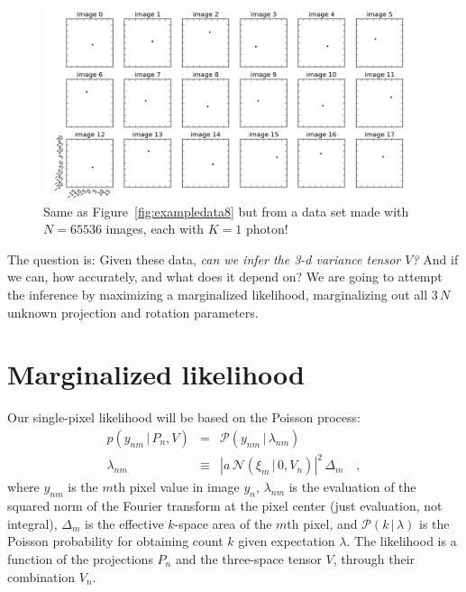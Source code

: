 \documentclass[12pt]{article}
\newcommand{\hoggcaption}[1]{\caption{\textsf{#1}}}
\renewcommand{\figurename}{\textsf{Figure}}
\newcommand{\normal}{\mathscr{N}}
\newcommand{\Poisson}{\mathscr{P}}
\newcommand{\sqnorm}[1]{|{#1}|^2}
\newcommand{\given}{\,|\,}
\begin{document}
\begin{figure}[!htp]
\includegraphics[width=\textwidth]{data_16_00.png}
\hoggcaption{Same as \figurename~\ref{fig:exampledata8} but from a data set made with
  $N=65536$ images, each with $K=1$ photon!\label{fig:exampledata0}}
\end{figure}

The question is:
Given these data, \emph{can we infer the 3-d variance tensor $V$?}
And if we can, how accurately, and what does it depend on?  We are
going to attempt the inference by maximizing a marginalized
likelihood, marginalizing out all $3\,N$ unknown projection and
rotation parameters.

\section{Marginalized likelihood}

Our single-pixel likelihood will be based on the Poisson process:
\begin{eqnarray}
  p(y_{nm}\given P_n,V) &=& \Poisson(y_{nm}\given\lambda_{nm})
  \\
  \lambda_{nm} &\equiv& \sqnorm{a\,\normal(\xi_m\given 0,V_n)}\,\Delta_m
  \quad,
\end{eqnarray}
where $y_{nm}$ is the $m$th pixel value in image $y_n$,
$\lambda_{nm}$ is the evaluation of the squared norm of the Fourier
transform at the pixel center (just evaluation, not integral),
$\Delta_m$ is the effective $k$-space area of the $m$th pixel,
and $\Poisson(k\given\lambda)$ is the Poisson probability for obtaining
count $k$ given expectation $\lambda$.
The likelihood is a function of the projections $P_n$ and the
three-space tensor $V$, through their combination $V_n$.
\end{document}
